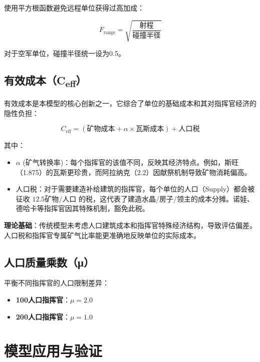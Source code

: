 \documentclass[a4paper,12pt]{article}
\begin{document}
使用平方根函数避免远程单位获得过高加成：

\begin{equation}
F_{\text{range}} = \sqrt{\frac{\text{射程}}{\text{碰撞半径}}}
\end{equation}

对于空军单位，碰撞半径统一设为0.5。

\subsection{有效成本（C\textsubscript{eff}）}

有效成本是本模型的核心创新之一，它综合了单位的基础成本和其对指挥官经济的隐性负担：

\begin{equation}
C_{\text{eff}} = (\text{矿物成本} + \alpha \times \text{瓦斯成本}) + \text{人口税}
\end{equation}

其中：
\begin{itemize}
    \item $\alpha$ (矿气转换率)：每个指挥官的该值不同，反映其经济特点。例如，斯旺（1.875）的瓦斯更珍贵，而阿拉纳克（2.2）因献祭机制导致矿物消耗偏高。
    \item 人口税：对于需要建造补给建筑的指挥官，每个单位的人口（Supply）都会被征收 $12.5\text{矿物}/\text{人口}$ 的税，这代表了建造水晶/房子/领主的成本分摊。诺娃、德哈卡等指挥官因其特殊机制，豁免此税。
\end{itemize}

\textbf{理论基础}：传统模型未考虑人口建筑成本和指挥官特殊经济结构，导致评估偏差。人口税和指挥官专属矿气比率能更准确地反映单位的实际成本。

\subsection{人口质量乘数（μ）}

平衡不同指挥官的人口限制差异：

\begin{itemize}
    \item \textbf{100人口指挥官}：$\mu = 2.0$
    \item \textbf{200人口指挥官}：$\mu = 1.0$
\end{itemize}

\section{模型应用与验证}
\end{document}
